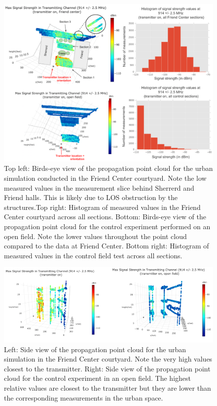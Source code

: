 \documentclass[pageno]{jpaper}
\begin{document}
\begin{figure}
	\caption[Bird's eye view and distributions of Friend Center and field control test point clouds.]{Top left: Birds-eye view of the propagation point cloud for the urban simulation conducted in the Friend Center courtyard. Note the low measured values in the measurement slice behind Sherrerd and Friend halls. This is likely due to LOS obstruction by the structures.Top right: Histogram of measured values in the Friend Center courtyard across all sections. Bottom: Birds-eye view of the propagation point cloud for the control experiment performed on an open field. Note the lower values throughout the point cloud compared to the data at Friend Center. Bottom right: Histogram of measured values in the control field test across all sections. }
	\centerline{\includegraphics{friend_2}}
\end{figure}

\begin{figure}
	\caption[Side view of Friend Center and field control test point clouds.]{Left: Side view of the propagation point cloud for the urban simulation in the Friend Center courtyard. Note the very high values closest to the transmitter. Right: Side view of the propagation point cloud for the control experiment in an open field. The highest relative values are closest to the transmitter but they are lower than the corresponding measurements in the urban space. }
	\centerline{\includegraphics{friend_4}}
\end{figure}
\end{document}
